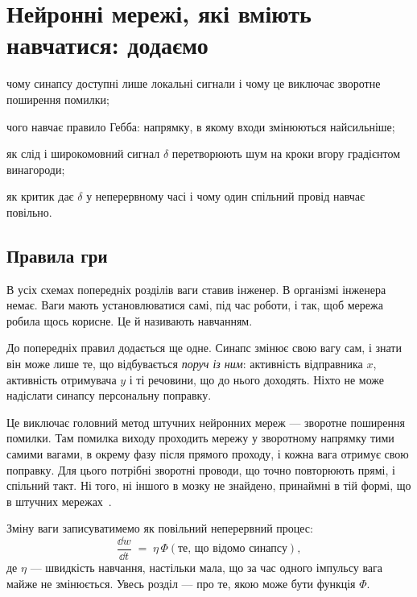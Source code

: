 \chapter{Нейронні мережі, які вміють навчатися: додаємо }
\label{sec:dofa}
\begin{chaptergoals}
\item чому синапсу доступні лише локальні сигнали і чому це виключає зворотне поширення помилки;
\item чого навчає правило Гебба: напрямку, в якому входи змінюються найсильніше;
\item як слід і широкомовний сигнал $\delta$ перетворюють шум на кроки вгору градієнтом винагороди;
\item як критик дає $\delta$ у неперервному часі і чому один спільний провід навчає повільно.
\end{chaptergoals}

\section{Правила гри}

В усіх схемах попередніх розділів ваги ставив інженер. В організмі інженера немає. Ваги мають установлюватися самі, під час роботи, і так, щоб мережа робила щось корисне. Це й називають навчанням.

До попередніх правил додається ще одне. Синапс змінює свою вагу сам, і знати він може лише те, що відбувається \emph{поруч із ним}: активність відправника $x$, активність отримувача $y$ і ті речовини, що до нього доходять. Ніхто не може надіслати синапсу персональну поправку.

Це виключає головний метод штучних нейронних мереж --- зворотне поширення помилки. Там помилка виходу проходить мережу у зворотному напрямку тими самими вагами, в окрему фазу після прямого проходу, і кожна вага отримує свою поправку. Для цього потрібні зворотні проводи, що точно повторюють прямі, і спільний такт. Ні того, ні іншого в мозку не знайдено, принаймні в тій формі, що в штучних мережах~\cite{Lillicrap2020,WhittingtonBogacz2019}.

Зміну ваги записуватимемо як повільний неперервний процес:
\begin{equation}
\frac{\dd w}{\dd t} \;=\; \eta\,\Phi(\text{те, що відомо синапсу}),
\label{eq:plasticity}
\end{equation}
де $\eta$ --- швидкість навчання, настільки мала, що за час одного імпульсу вага майже не змінюється. Увесь розділ --- про те, якою може бути функція $\Phi$.

